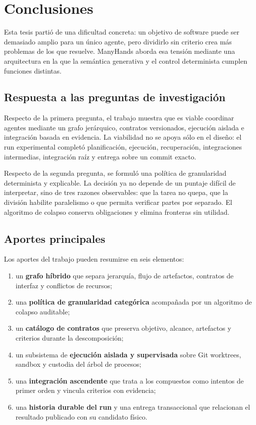 \chapter{Conclusiones}
\label{cap:conclusiones}

Esta tesis partió de una dificultad concreta: un objetivo de software puede ser
demasiado amplio para un único agente, pero dividirlo sin criterio crea más
problemas de los que resuelve. ManyHands aborda esa tensión mediante una
arquitectura en la que la semántica generativa y el control determinista cumplen
funciones distintas.

\section{Respuesta a las preguntas de investigación}

Respecto de la primera pregunta, el trabajo muestra que es viable coordinar
agentes mediante un grafo jerárquico, contratos versionados, ejecución aislada e
integración basada en evidencia. La viabilidad no se apoya sólo en el diseño:
el run experimental completó planificación, ejecución, recuperación,
integraciones intermedias, integración raíz y entrega sobre un commit exacto.

Respecto de la segunda pregunta, se formuló una política de granularidad
determinista y explicable. La decisión ya no depende de un puntaje difícil de
interpretar, sino de tres razones observables: que la tarea no quepa, que la
división habilite paralelismo o que permita verificar partes por separado. El
algoritmo de colapso conserva obligaciones y elimina fronteras sin utilidad.

\section{Aportes principales}

Los aportes del trabajo pueden resumirse en seis elementos:

\begin{enumerate}
  \item un \textbf{grafo híbrido} que separa jerarquía, flujo de artefactos,
  contratos de interfaz y conflictos de recursos;
  \item una \textbf{política de granularidad categórica} acompañada por un
  algoritmo de colapso auditable;
  \item un \textbf{catálogo de contratos} que preserva objetivo, alcance,
  artefactos y criterios durante la descomposición;
  \item un subsistema de \textbf{ejecución aislada y supervisada} sobre Git
  worktrees, sandbox y custodia del árbol de procesos;
  \item una \textbf{integración ascendente} que trata a los compuestos como
  intentos de primer orden y vincula criterios con evidencia;
  \item una \textbf{historia durable del run} y una entrega transaccional que
  relacionan el resultado publicado con su candidato físico.
\end{enumerate}

